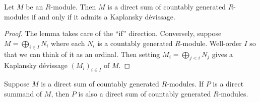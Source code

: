 \begin{lemma}[10.84.3]
Let $M$ be an $R$-module. Then $M$ is a direct sum of countably generated $R$-modules if and only if it admits a Kaplansky d\'evissage.
\end{lemma}
\begin{proof}
The lemma takes care of the ``if'' direction. Conversely, suppose $M=\bigoplus_{i\in I}N_i$ where each $N_i$ is a countably generated $R$-module. Well-order $I$ so that we can think of it as an ordinal. Then setting $M_i=\bigoplus_{j<i}N_j$ gives a Kaplansky d\'evissage $(M_i)_{i\in I}$ of $M$.
\end{proof}
\begin{theorem}[10.84.4]
Suppose $M$ is a direct sum of countably generated $R$-modules. If $P$ is a direct summand of $M$, then $P$ is also a direct sum of countably generated $R$-modules.
\end{theorem}
